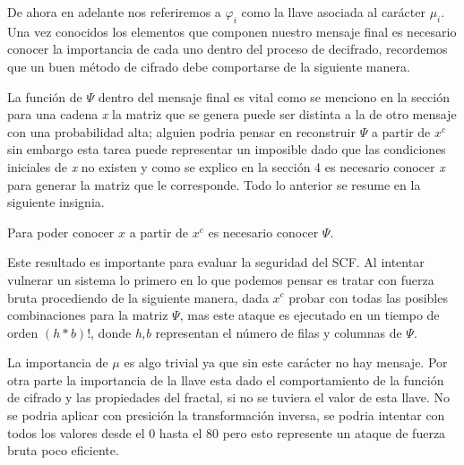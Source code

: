 De ahora en adelante nos referiremos a $\varphi_{i}$ como la llave asociada al car\'acter $\mu_{i}$. Una vez conocidos los elementos que componen nuestro mensaje final es necesario conocer la importancia de cada uno dentro del proceso de decifrado, recordemos que un buen m\'etodo de cifrado debe comportarse de la siguiente manera.


La funci\'on de $\Psi$ dentro del mensaje final es vital como se menciono en la secci\'on para una cadena \emph{x} la matriz que se genera puede ser distinta a la de otro mensaje con una probabilidad alta; alguien podria pensar en reconstruir $\Psi$ a partir de $x^{c}$ sin embargo esta tarea puede representar un imposible dado que las condiciones iniciales de \emph{x} no existen y como se explico en la secci\'on 4 es necesario conocer \emph{x} para generar la matriz que le corresponde. Todo lo anterior se resume en la siguiente insignia.

\begin{insig}
	Para poder conocer $x$ a partir de $x^{c}$ es necesario conocer $\Psi$.
\end{insig}

Este resultado es importante para evaluar la seguridad del SCF. Al intentar vulnerar un sistema lo primero en lo que podemos pensar es tratar con fuerza bruta procediendo de la siguiente manera, dada $x^{c}$ probar con todas las posibles combinaciones para la matriz $\Psi$, mas este ataque es ejecutado en un tiempo de orden $(h*b)!$, donde \emph{h,b} representan el n\'umero de filas y columnas de $\Psi$.

La importancia de $\mu$ es algo trivial ya que sin este car\'acter no hay mensaje. Por otra parte la importancia de la llave esta dado el comportamiento de la funci\'on de cifrado y las propiedades del fractal, si no se tuviera el valor de esta llave. No se podria aplicar con presici\'on la transformaci\'on inversa, se podria intentar con todos los valores desde el 0 hasta el 80 pero esto represente un ataque de fuerza bruta poco eficiente.
